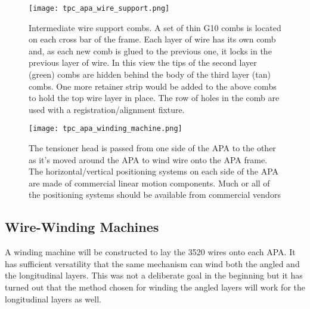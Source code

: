 \begin{figure}[htpb]
\centering
\texttt{[image: tpc\_apa\_wire\_support.png]}
\caption[Conceptual design of the wire support for the U, V \& X wires]{Intermediate wire support combs.  A set of thin G10 combs is located on each cross bar of the frame.  Each layer of wire has its own comb and, as each new comb is glued to the previous one, it locks in the previous layer of wire.  In this view the tips of the second layer (green) combs are hidden behind the body of the third layer (tan) combs.  One more retainer strip would be added to the above combs to hold the top wire layer in place.  The row of holes in the comb are used with a registration/alignment fixture.}
\label{fig:tpc-wire-support}
\end{figure}

\begin{figure}[htpb]
\centering
\texttt{[image: tpc\_apa\_winding\_machine.png]}
\caption[Winding machine concepts]{The tensioner head is passed from one side of the APA to the other as it’s moved around the APA to wind wire onto the APA frame.  The horizontal/vertical positioning systems on each side of the APA are made of commercial linear motion components.  Much or all of the positioning systems should be available from commercial vendors}
\label{fig:tpc-winding-machine}
\end{figure}

\subsection{Wire-Winding Machines}

A winding machine will be constructed to lay the 3520 wires onto each APA. It has sufficient versatility that the same mechanism can wind both the angled and the longitudinal layers.  This was not a deliberate goal in the beginning but it has turned out that the method chosen for winding the angled layers will work for the longitudinal layers as well.
 
